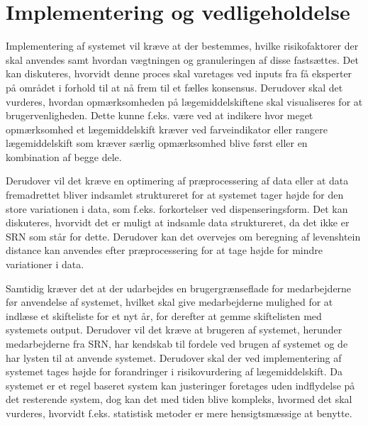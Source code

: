 \section{Implementering og vedligeholdelse}
Implementering af systemet vil kræve at der bestemmes, hvilke risikofaktorer der skal anvendes samt hvordan vægtningen og granuleringen af disse fastsættes. Det kan diskuteres, hvorvidt denne proces skal varetages ved inputs fra få eksperter på området i forhold til at nå frem til et fælles konsensus. Derudover skal det vurderes, hvordan opmærksomheden på lægemiddelskiftene skal visualiseres for at brugervenligheden. Dette kunne f.eks. være ved at indikere hvor meget opmærksomhed et lægemiddelskift kræver ved farveindikator eller rangere lægemiddelskift som kræver særlig opmærksomhed blive først eller en kombination af begge dele.

Derudover vil det kræve en optimering af præprocessering af data eller at data fremadrettet bliver indsamlet struktureret for at systemet tager højde for den store variationen i data, som f.eks. forkortelser ved dispenseringsform. Det kan diskuteres, hvorvidt det er muligt at indsamle data struktureret, da det ikke er SRN som står for dette. Derudover kan det overvejes om beregning af levenshtein distance kan anvendes efter præprocessering for at tage højde for mindre variationer i data. 

Samtidig kræver det at der udarbejdes en brugergrænseflade for medarbejderne før anvendelse af systemet, hvilket skal give medarbejderne mulighed for at indlæse et skifteliste for et nyt år, for derefter at gemme skiftelisten med systemets output. Derudover vil det kræve at brugeren af systemet, herunder medarbejderne fra SRN, har kendskab til fordele ved brugen af systemet og de har lysten til at anvende systemet. Derudover skal der ved implementering af systemet tages højde for forandringer i risikovurdering af lægemiddelskift. Da  systemet er et regel baseret system kan justeringer foretages uden indflydelse på det resterende system, dog kan det med tiden blive kompleks, hvormed det skal vurderes, hvorvidt f.eks. statistisk metoder er mere hensigtsmæssige at benytte.



